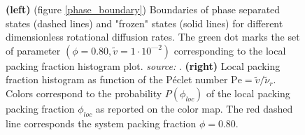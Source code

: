 \documentclass[class=report, float=false, crop=false]{standalone}
\begin{document}
\begin{figure}[h!]
\centering
{}
\caption{\textbf{(left)} (figure \ref{phase_boundary}) Boundaries of phase separated states (dashed lines) and "frozen" states (solid lines) for different dimensionless rotational diffusion rates. The green dot marks the set of parameter $(\phi = 0.80, \tilde{v} = 1\cdot10^{—2})$ corresponding to the local packing fraction histogram plot. \textit{source:} \cite{fily2014freezing}. \textbf{(right)} Local packing fraction histogram as function of the P\'eclet number $\text{Pe} = \tilde{v}/\tilde{\nu}_r$. Colors correspond to the probability $P(\phi_{loc})$ of the local packing packing fraction $\phi_{loc}$ as reported on the color map. The red dashed line corresponds the system packing fraction $\phi = 0.80$.}
\label{philoc_dr}
\end{figure}
\end{document}
